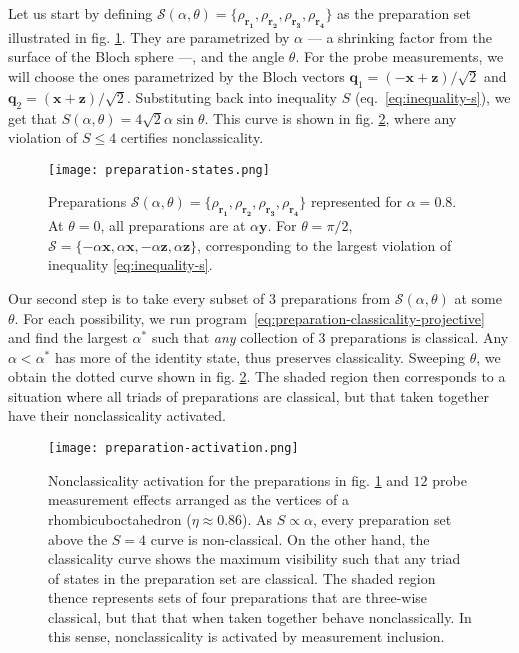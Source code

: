             Let us start by defining $\mathcal{S}(\alpha, \theta) = \{ \rho_{\mathbf{r_1}}, \rho_{\mathbf{r_2}}, \rho_{\mathbf{r_3}}, \rho_{\mathbf{r_4}} \}$ as the preparation set illustrated in fig. \ref{fig:preparation-set-activation}. They are parametrized by $\alpha$ --- a shrinking factor from the surface of the Bloch sphere ---, and the angle $\theta$. For the probe measurements, we will choose the ones parametrized by the Bloch vectors $\mathbf{q}_1 = (- \mathbf{x} + \mathbf{z}) / \sqrt{2}$ and  $\mathbf{q}_2 = (\mathbf{x} + \mathbf{z}) / \sqrt{2}$. Substituting back into inequality $S$ (eq.~\eqref{eq:inequality-s}), we get that $S(\alpha, \theta) = 4\sqrt{2} \alpha \sin \theta$. This curve is shown in fig. \ref{fig:nonclassicality-activation}, where any violation of $S \leq 4$ certifies nonclassicality.

            \begin{figure}
                \centering
                \texttt{[image: preparation-states.png]}
                \caption{Preparations $\mathcal{S}(\alpha, \theta) = \{ \rho_{\mathbf{r_1}}, \rho_{\mathbf{r_2}}, \rho_{\mathbf{r_3}}, \rho_{\mathbf{r_4}} \}$ represented for $\alpha=0.8$. At $\theta=0$, all preparations are at $\alpha \mathbf{y}$. For $\theta = \pi/2$, $\mathcal{S} =  \{ -\alpha\mathbf{x}, \alpha\mathbf{x}, -\alpha\mathbf{z}, \alpha\mathbf{z} \}$, corresponding to the largest violation of inequality \eqref{eq:inequality-s}.}
            \label{fig:preparation-set-activation}
            \end{figure}

            Our second step is to take every subset of $3$ preparations from $\mathcal{S}(\alpha, \theta)$ at some $\theta$. For each possibility, we run program~\eqref{eq:preparation-classicality-projective} and find the largest $\alpha^*$ such that \emph{any} collection of $3$ preparations is classical. Any $\alpha < \alpha^*$ has more of the identity state, thus preserves classicality. Sweeping $\theta$, we obtain the dotted curve shown in fig. \ref{fig:nonclassicality-activation}. The shaded region then corresponds to a situation where all triads of preparations are classical, but that taken together have their nonclassicality activated.

            \begin{figure}
                \centering
                \texttt{[image: preparation-activation.png]}
                \caption{Nonclassicality activation for the preparations in fig. \ref{fig:preparation-set-activation} and $12$ probe measurement effects arranged as the vertices of a rhombicuboctahedron ($\eta \approx 0.86$). As $S \propto \alpha$, every preparation set above the $S=4$ curve is non-classical. On the other hand, the classicality curve shows the maximum visibility such that any triad of states in the preparation set are classical. The shaded region thence represents sets of four preparations that are three-wise classical, but that that when taken together behave nonclassically. In this sense, nonclassicality is activated by measurement inclusion.}
            \label{fig:nonclassicality-activation}
            \end{figure}
            
